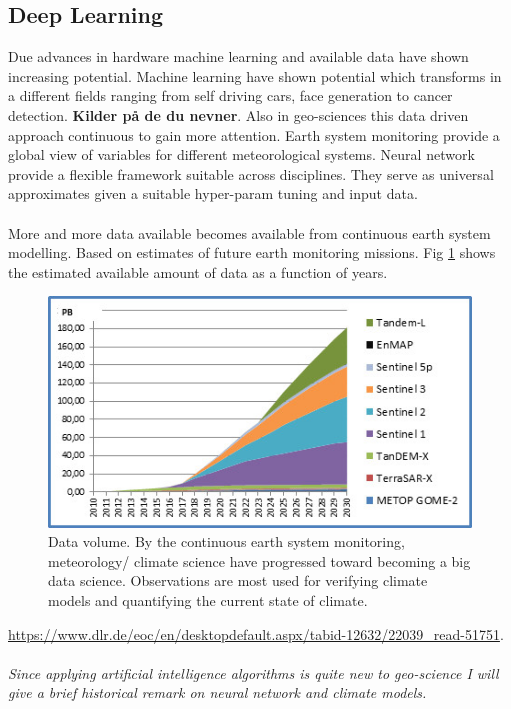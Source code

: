 \subsection{Deep Learning}
Due advances in hardware machine learning and available data have shown increasing potential. Machine learning have shown potential which transforms in a different fields ranging from self driving cars, face generation to cancer detection. \textbf{Kilder på de du nevner}. Also in geo-sciences this data driven approach continuous to gain more attention. Earth system monitoring provide a global view of variables for different meteorological systems. Neural network provide a flexible framework suitable across disciplines. They serve as universal approximates given a suitable hyper-param tuning and input data.
\\ \\ 
More and more data available becomes available from continuous earth system modelling. Based on estimates of future earth monitoring missions. Fig \ref{fig:data_volum_sat} shows the estimated available amount of data as a function of years.
\begin{figure}
    \centering
    \includegraphics{Datenvolumen_D-SDA.jpg}
    \caption{Data volume. By the continuous earth system monitoring, meteorology/ climate science have progressed toward becoming a big data science. Observations are most used for verifying climate models and quantifying the current state of climate. }
    \label{fig:data_volum_sat}
\end{figure}
\href{https://www.dlr.de/eoc/en/desktopdefault.aspx/tabid-12632/22039_read-51751}{https://www.dlr.de/eoc/en/desktopdefault.aspx/tabid-12632/22039_read-51751}.
\\ \\ 
\textit{Since applying artificial intelligence algorithms is quite new to geo-science I will give a brief historical remark on neural network and climate models.}
